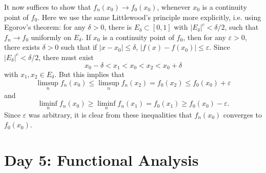 \documentclass{exam}
\theoremstyle{problemstyle}
\newcommand{\1}[1]{\textbf{1}_{\left[#1\right]}} %
\begin{document}
\begin{questions}
\begin{solution}
	It now suffices to show that $f_n(x_0) \to f_0(x_0)$, whenever $x_0$ is a continuity point of $f_0$. Here we use the same Littlewood's principle more explicitly, i.e. using Egorov's theorem: for any $\delta > 0$, there is $E_\delta \subset [0,1]$ with $|E_\delta|^c < \delta/2$, such that $f_n \to f_0$ uniformly on $E_\delta$. If $x_0$ is a continuity point of $f_0$, then for any $\varepsilon > 0$, there exists $\delta > 0$ such that if $|x - x_0| \leq \delta$, $|f(x) - f(x_0)| \leq \varepsilon$. Since $|E_\delta|^c < \delta/2$, there must exist
	\[ x_0 - \delta < x_1 < x_0 < x_2 < x_0 + \delta \]
	with $x_1,x_2 \in E_\delta$. But this implies that
	\[ \limsup_n f_n(x_0) \leq \limsup_n f_n(x_2) = f_0(x_2) \leq f_0(x_0) + \varepsilon \]
	and
	\[ \liminf_n f_n(x_0) \geq \liminf_n f_n(x_1) = f_0(x_1) \geq f_0(x_0) - \varepsilon. \]
	Since $\varepsilon$ was arbitrary, it is clear from these inequalities that $f_n(x_0)$ converges to $f_0(x_0)$.
\end{solution}

\newpage
\section{Day 5: Functional Analysis}


\end{questions}
\end{document}

